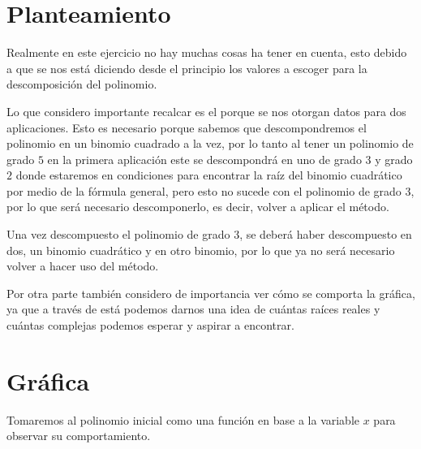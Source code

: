 \documentclass{article}
\begin{document}
\section{Planteamiento}
Realmente en este ejercicio no hay muchas cosas ha tener en cuenta, esto debido a
que se nos está diciendo desde el principio los valores a escoger para la descomposición
del polinomio.


Lo que considero importante recalcar es el porque se nos otorgan datos
para dos aplicaciones. Esto es necesario porque sabemos que descompondremos el polinomio en
un binomio cuadrado a la vez, por lo tanto al tener un polinomio de grado $5$ en la
primera aplicación este se descompondrá en uno de grado $3$ y grado $2$ donde estaremos
en condiciones para encontrar la raíz del binomio cuadrático por medio de la fórmula
general, pero esto no sucede con el polinomio de grado $3$, por lo que será necesario
descomponerlo, es decir, volver a aplicar el método.


Una vez descompuesto el polinomio de grado $3$, se deberá haber descompuesto en dos,
un binomio cuadrático y en otro binomio, por lo que ya no será necesario volver a
hacer uso del método.


Por otra parte también considero de importancia ver cómo se comporta la gráfica,
ya que a través de está podemos darnos una idea de cuántas raíces reales y cuántas
complejas podemos esperar y aspirar a encontrar.


\section{Gráfica}
Tomaremos al polinomio inicial como una función en base a la variable $x$ para observar
su comportamiento.


\begin{figure}[h]
   \centering
\end{figure}
\end{document}
